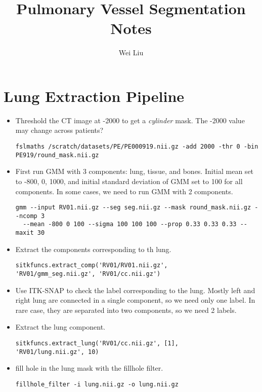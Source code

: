 \documentclass[12pt]{article}
\begin{document}
\title{Pulmonary Vessel Segmentation Notes}
\author{Wei Liu}
\maketitle

\section{Lung Extraction Pipeline}
\begin{itemize}
\item Threshold the CT image at -2000 to get a \emph{cylinder} mask. The -2000
  value may change across patients?

\begin{Verbatim}[frame=single]
fslmaths /scratch/datasets/PE/PE000919.nii.gz -add 2000 -thr 0 -bin
PE919/round_mask.nii.gz
\end{Verbatim}

\item First run GMM with 3 components: lung, tissue, and bones. Initial
mean set to -800, 0, 1000, and initial standard deviation of GMM set to 100
for all components.  In some cases, we need to run GMM with 2 components.
\begin{Verbatim}[frame=single]
  gmm --input RV01.nii.gz --seg seg.nii.gz --mask round_mask.nii.gz --ncomp 3
  --mean -800 0 100 --sigma 100 100 100 --prop 0.33 0.33 0.33 --maxit 30
\end{Verbatim}
\item Extract the components corresponding to th lung.
\begin{Verbatim}[frame=single]
sitkfuncs.extract_comp('RV01/RV01.nii.gz', 
'RV01/gmm_seg.nii.gz', 'RV01/cc.nii.gz')
\end{Verbatim}
\item Use ITK-SNAP to check the label corresponding to the lung. Mostly left
  and right lung are connected in a single component, so we need only one
  label. In rare case, they are separated into two components, so we need 2
  labels. 

\item Extract the lung component.

\begin{Verbatim}[frame=single]
 sitkfuncs.extract_lung('RV01/cc.nii.gz', [1], 
'RV01/lung.nii.gz', 10)
\end{Verbatim}

\item fill hole in the lung mask with the fillhole filter.

\begin{Verbatim}[frame=single]
fillhole_filter -i lung.nii.gz -o lung.nii.gz
\end{Verbatim}

\end{itemize}
\end{document}
